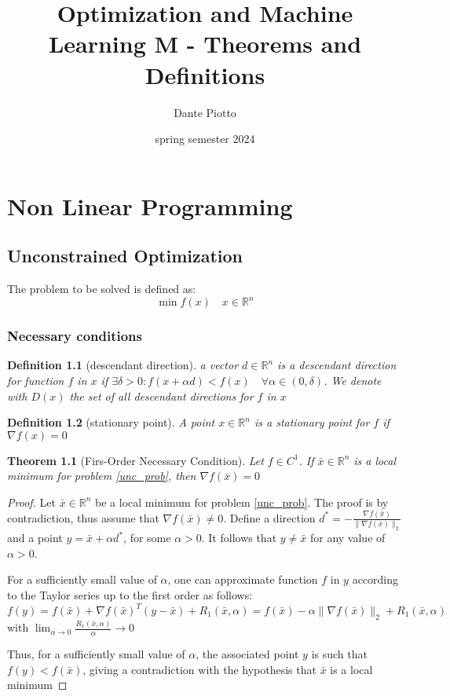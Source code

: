 \documentclass{book}
\title{Optimization and Machine Learning M - Theorems and Definitions}
\author{Dante Piotto}
\date{spring semester 2024}
\newcommand{\R}{\mathbb{R}}
\theoremstyle{theoremv2}
\newtheorem{theorem}{Theorem}[chapter]
\theoremstyle{defv2}
\newtheorem{definition}{Definition}[chapter]
\theoremstyle{remark}
\theoremstyle{remark}
\begin{document}
\maketitle
\tableofcontents
\chapter{Non Linear Programming}
\section{Unconstrained Optimization}
The problem to be solved is defined as: 
\[
    \min f(x) \quad x \in\R^n \label{unc_prob}
\]
\subsection{Necessary conditions}
\begin{definition}[descendant direction]
    a vector $d\in\R^n$ is a \emph{descendant direction} for function $f$ in $x$ if $\exists \delta > 0 : f(x+\alpha d)<f(x) \quad \forall \alpha \in (0,\delta)$. We denote with $D(x)$ the set of all descendant directions for $f$ in $x$
\end{definition}
\begin{definition}[stationary point]
    A point $x\in\R^n$ is a \emph{stationary point} for $f$ if $\nabla f(x) = 0$
\end{definition}
\begin{theorem}[Firs-Order Necessary Condition]
    Let $f\in C^1$. If $\bar{x}\in\R^n$ is a local minimum for problem \eqref{unc_prob}, then $\nabla f(\bar{x})=0$
\end{theorem}
\begin{proof}
    Let $\bar{x}\in\R^n$ be a local minimum for problem \eqref{unc_prob}. The proof is by contradiction, thus assume that $\nabla f(\bar{x})\neq 0$. Define a direction $d^*=-\displaystyle\frac{\nabla f(\bar{x})}{\|\nabla f(\bar{x})\|_2}$ and a point $y=\bar{x}+\alpha d^*$, for some $\alpha>0$. It follows that $y\neq \bar{x}$ for any value of $\alpha>0$.

    For a sufficiently small value of $\alpha$, one can approximate function $f$ in $y$ according to the Taylor series up to the first order as follows: 
    \[
        f(y) = f(\bar{x}) + \nabla f(\bar{x})^T (y-\bar{x}) +R_1(\bar{x},\alpha) = f(\bar{x}) -\alpha\|\nabla f(\bar{x})\|_2 + R_1(\bar{x},\alpha)
    \]
    with $\lim_{\alpha\to 0} \displaystyle\frac{R_1(\bar{x},\alpha)}{\alpha}\to 0$

    Thus, for a sufficiently small value of $\alpha$, the associated point $y$ is such that $f(y)<f(\bar{x})$, giving a contradiction with the hypothesis that $\bar{x}$ is a local minimum
\end{proof}
\end{document}
